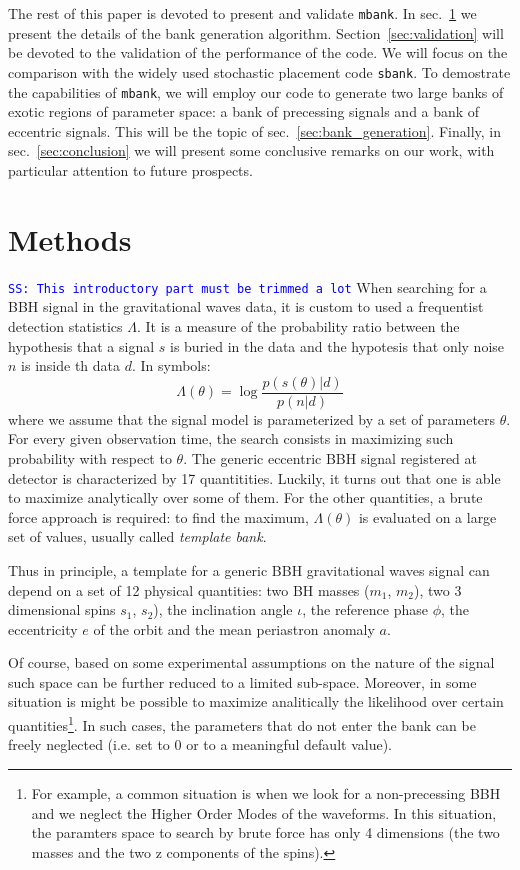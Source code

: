 \documentclass[twocolumn,showpacs,preprintnumbers,nofootinbib,prd,
superscriptaddress,10pt]{revtex4-1}
\newcommand{\stefano}[1]{{\textcolor{blue}{\texttt{SS: #1}} }}
\begin{document}
The rest of this paper is devoted to present and validate \texttt{mbank}.
In sec.~\ref{sec:methods} we present the details of the bank generation algorithm.
Section~\ref{sec:validation} will be devoted to the validation of the performance of the code. We will focus on the comparison with the widely used stochastic placement code \texttt{sbank}.
To demostrate the capabilities of \texttt{mbank}, we will employ our code to generate two large banks of exotic regions of parameter space: a bank of precessing signals and a bank of eccentric signals. This will be the topic of sec.~\ref{sec:bank_generation}.
Finally, in sec.~\ref{sec:conclusion} we will present some conclusive remarks on our work, with particular attention to future prospects.

\section{Methods} \label{sec:methods}

\stefano{This introductory part must be trimmed a lot}
When searching for a BBH signal in the gravitational waves data, it is custom to used a frequentist detection statistics $\Lambda$. It is a measure of the probability ratio between the hypothesis that a signal $s$ is buried in the data and the hypotesis that only noise $n$ is inside th data $d$. In symbols:
\begin{equation}
	\Lambda(\theta) = \log\frac{p(s(\theta)|d)}{p(n|d)}
\end{equation}
where we assume that the signal model is parameterized by a set of parameters $\theta$.
For every given observation time, the search consists in maximizing such probability with respect to $\theta$. 
The generic eccentric BBH signal registered at detector is characterized by 17 quantitities. Luckily, it turns out that one is able to maximize analytically over some of them. For the other quantities, a brute force approach is required: to find the maximum, $\Lambda(\theta)$ is evaluated on a large set of values, usually called {\it template bank}. 

Thus in principle, a template for a generic BBH gravitational waves signal can depend on a set of 12 physical quantities: two BH masses ($m_1$, $m_2$), two 3 dimensional spins $s_1$, $s_2$), the inclination angle $\iota$, the reference phase $\phi$, the eccentricity $e$ of the orbit and the mean periastron anomaly $a$.

Of course, based on some experimental assumptions on the nature of the signal such space can be further reduced to a limited sub-space. Moreover, in some situation is might be possible to maximize analitically the likelihood over certain quantities\footnote{
For example, a common situation is when we look for a non-precessing BBH and we neglect the Higher Order Modes of the waveforms. In this situation, the paramters space to search by brute force has only 4 dimensions (the two masses and the two z components of the spins).}.
In such cases, the parameters that do not enter the bank can be freely neglected (i.e. set to $0$ or to a meaningful default value).
\end{document}
